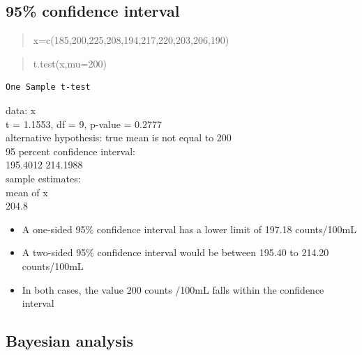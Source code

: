 \documentclass[
]{book}
\providecommand{\tightlist}{%
  \setlength{\itemsep}{0pt}\setlength{\parskip}{0pt}}
\begin{document}
\hypertarget{confidence-interval}{%
\subsection{95\% confidence interval}\label{confidence-interval}}

\begin{quote}
x=c(185,200,225,208,194,217,220,203,206,190)
\end{quote}

\begin{quote}
t.test(x,mu=200)
\end{quote}

\begin{verbatim}
One Sample t-test  
\end{verbatim}

data: x\\
t = 1.1553, df = 9, p-value = 0.2777\\
alternative hypothesis: true mean is not equal to 200\\
95 percent confidence interval:\\
{195.4012 214.1988}\\
sample estimates:\\
mean of x\\
204.8

\begin{itemize}
\tightlist
\item
  A one-sided 95\% confidence interval has a lower limit of 197.18 counts/100mL
\item
  A two-sided 95\% confidence interval would be between 195.40 to 214.20 counts/100mL
\item
  In both cases, the value 200 counts /100mL falls within the confidence interval
\end{itemize}

\hypertarget{bayesian-analysis}{%
\subsection{Bayesian analysis}\label{bayesian-analysis}}
\end{document}
